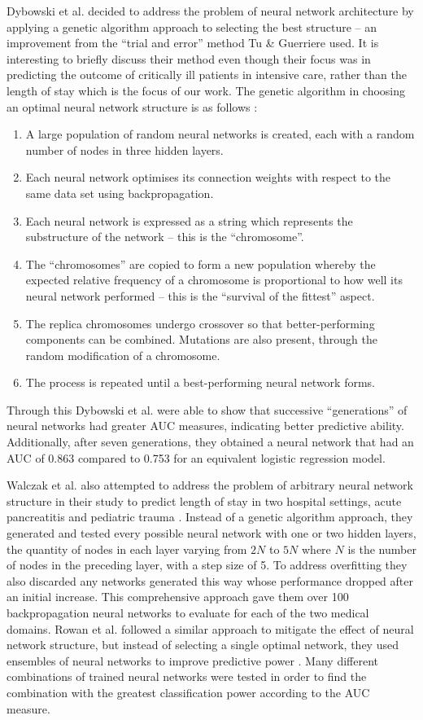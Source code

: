 Dybowski et al. decided to address the problem of neural network architecture
by applying a genetic algorithm approach to selecting the best
structure \citep{Dybowski1996} --
an improvement from the ``trial and error'' method Tu \& Guerriere used. It is
interesting to briefly discuss their method even though their focus was
in predicting the outcome of critically ill patients in intensive care, rather
than the length of stay which is the focus of our work. The genetic algorithm
in choosing an optimal neural network structure is as
follows \citep{Dybowski1996}:
\begin{enumerate}
\item A large population of random neural networks is created, each with
a random number of nodes in three hidden layers.
\item Each neural network optimises
its connection weights with respect to the same data set using
backpropagation.
\item Each neural network is expressed as a string which represents the
substructure of the network -- this is the ``chromosome''.
\item The ``chromosomes'' are copied to form a new population whereby the
expected relative frequency of a chromosome is proportional to how well
its neural network performed -- this is the ``survival of the fittest''
aspect.
\item The replica chromosomes undergo crossover so that better-performing
components can be combined. Mutations are also present, through the random
modification of a chromosome.
\item The process is repeated until a best-performing neural network forms.
\end{enumerate}
Through this Dybowski et al. were able to show that successive ``generations''
of neural networks had greater AUC measures, indicating better predictive
ability. Additionally, after seven generations, they obtained a neural network
that had an AUC of 0.863 compared to 0.753 for an equivalent logistic
regression model.

Walczak et al. also attempted to address the problem of arbitrary neural
network structure in their study to predict length of stay in two hospital
settings, acute pancreatitis and pediatric trauma \citep{Walczak2003}. Instead
of a genetic algorithm approach, they generated and tested every possible
neural network with one or two hidden layers, the quantity of nodes in each
layer varying from $2N$ to $5N$ where $N$ is the number of nodes in the
preceding layer, with a step size of 5. To address overfitting they also
discarded any networks generated this way whose performance dropped after
an initial increase. This comprehensive approach gave them over 100
backpropagation neural networks to evaluate for each of the two medical
domains. 
Rowan et al. followed a similar
approach to mitigate the effect of neural network structure, but instead of
selecting a single optimal network, they used ensembles of neural networks
to improve predictive power \citep{Rowan2007}. Many different combinations of
trained neural networks were tested in order to find the combination with the
greatest classification power according to the AUC measure.

